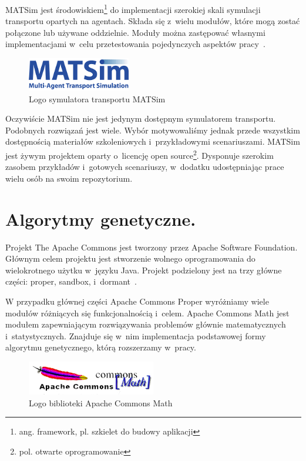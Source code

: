 \documentclass[twoside,12pt]{report}
\begin{document}
MATSim jest środowiskiem\footnote{ang. framework, pl. szkielet do budowy aplikacji} do implementacji szerokiej skali symulacji transportu opartych na agentach. Składa się z~wielu modułów, które mogą zostać połączone lub używane oddzielnie. Moduły można zastępować własnymi implementacjami w~celu przetestowania pojedynczych aspektów pracy~\cite{matsim}.

\begin{figure}[ht]
\centering
\includegraphics[width=0.40\textwidth]{img/matsim}
\caption{Logo symulatora transportu MATSim} 
\end{figure}

Oczywiście MATSim nie jest jedynym dostępnym symulatorem transportu. Podobnych rozwiązań jest wiele. Wybór motywowaliśmy jednak przede wszystkim dostępnością materiałów szkoleniowych i~przykładowymi scenariuszami. MATSim jest żywym projektem oparty o~licencję open source\footnote{pol. otwarte oprogramowanie}. Dysponuje szerokim zasobem przykładów i~gotowych scenariuszy, w~dodatku udostępniając prace wielu osób na swoim repozytorium.

\section{Algorytmy genetyczne.}

Projekt The Apache Commons jest tworzony przez Apache Software Foundation. Głównym celem projektu jest stworzenie wolnego oprogramowania do wielokrotnego użytku w~języku Java. Projekt podzielony jest na trzy główne części: proper, sandbox, i~dormant~\cite{math}.

W przypadku głównej części Apache Commons Proper wyróżniamy wiele modułów różniących się funkcjonalnością i~celem. Apache Commons Math jest modułem zapewniającym rozwiązywania problemów głównie matematycznych i~statystycznych. Znajduje się w~nim implementacja podstawowej formy algorytmu genetycznego, którą rozszerzamy w~pracy.

\begin{figure}[ht]
\centering
\includegraphics[width=0.50\textwidth]{img/math}
\caption{Logo biblioteki Apache Commons Math} 
\end{figure}
\end{document}
